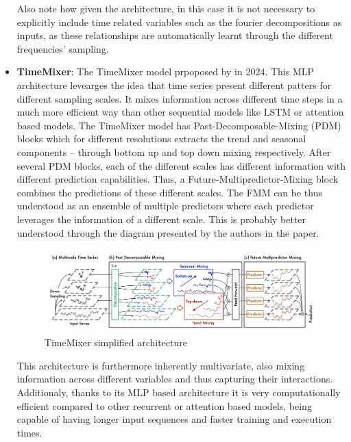 \begin{itemize}
    Also note how given the architecture, in this case it is not necessary to explicitly include time related variables such as the fourier decompositions as inputs, as these relationships are automatically learnt through the different frequencies' sampling.

    \item \textbf{TimeMixer}: The TimeMixer model prpoposed by \cite{wang_wu_shi_hu_luo_ma_zhang_zhou} in 2024. This MLP architecture levearges the idea that time series present different patters for different sampling scales. It mixes information across different time steps in a much more efficient way than other sequential models like LSTM or attention based models. The TimeMixer model has Past-Decomposable-Mixing (PDM) blocks which for different resolutions extracts the trend and seasonal components -- through bottom up and top down mixing respectively. After several PDM blocks, each of the different scales has different information with different prediction capabilities. Thus, a Future-Multipredictor-Mixing block combines the predictions of these different scales. The FMM can be thus understood as an ensemble of multiple predictors where each predictor leverages the information of a different scale. This is probably better understood through the diagram presented by the authors in the paper.
    \begin{figure}[ht]
        \centering
        \captionsetup{justification=centering}
        \includegraphics[width=\linewidth]{assets/timemixer-architecture.png}
        \caption{TimeMixer simplified architecture}
        \label{fig:timemixer-architecture}
    \end{figure}
    This architecture is furthermore inherently multivariate, also mixing information across different variables and thus capturing their interactions. Additionaly, thanks to its MLP based architecture it is very computationally efficient compared to other recurrent or attention based models, being capable of having longer input sequences and faster training and execution times. 
\end{itemize}
